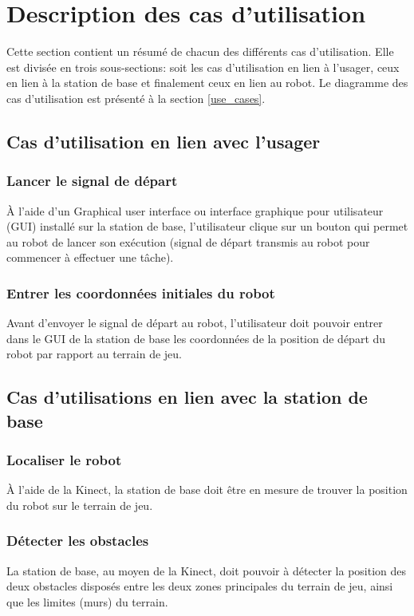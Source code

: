 


\chapter{Description des cas d'utilisation}
\label{s:utilisation}
Cette section contient un résumé de chacun des différents cas d'utilisation. Elle est divisée en trois sous-sections: soit les cas d'utilisation en lien à l'usager, ceux en lien à la station de base et finalement ceux en lien au robot. Le diagramme des cas d'utilisation est présenté à la section \ref{use_cases}.
\section{Cas d'utilisation en lien avec l'usager}
\subsection{Lancer le signal de départ}
À l'aide d'un Graphical user interface ou interface graphique pour utilisateur (GUI) installé sur la station de base, l'utilisateur clique sur un bouton qui permet au robot de lancer son exécution (signal de départ transmis au robot pour commencer à effectuer une tâche).
\subsection{Entrer les coordonnées initiales du robot}
Avant d'envoyer le signal de départ au robot, l'utilisateur doit pouvoir entrer dans le GUI de la station de base les coordonnées de la position de départ du robot par rapport au terrain de jeu.
\section{Cas d'utilisations en lien avec la station de base}
\subsection{Localiser le robot}
À l'aide de la Kinect, la station de base doit être en mesure de trouver la position du robot sur le terrain de jeu.
\subsection{Détecter les obstacles}
La station de base, au moyen de la Kinect, doit pouvoir à détecter la position des deux obstacles disposés entre les deux zones principales du terrain de jeu, ainsi que les limites (murs) du terrain.
